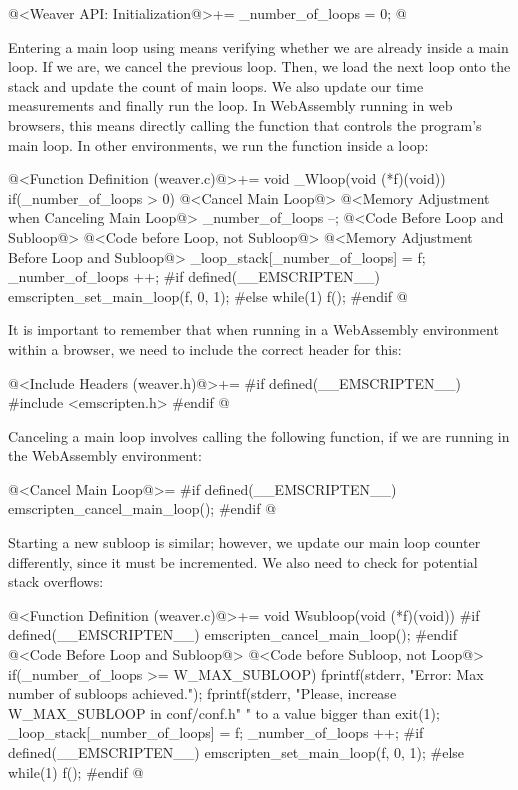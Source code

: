 \iniciocodigo
@<Weaver API: Initialization@>+=
_number_of_loops = 0;
@
\fimcodigo

Entering a main loop using  means verifying whether
we are already inside a main loop. If we are, we cancel the previous
loop. Then, we load the next loop onto the stack and update the count
of main loops. We also update our time measurements and finally run
the loop. In WebAssembly running in web browsers, this means directly
calling the function that controls the program's main loop. In other
environments, we run the function inside a  loop:

\iniciocodigo
@<Function Definition (weaver.c)@>+=
void _Wloop(void (*f)(void)){
  if(_number_of_loops > 0){
    @<Cancel Main Loop@>
    @<Memory Adjustment when Canceling Main Loop@>
    _number_of_loops --;
  }
  @<Code Before Loop and Subloop@>
  @<Code before Loop, not Subloop@>
  @<Memory Adjustment Before Loop and Subloop@>
  _loop_stack[_number_of_loops] = f;
  _number_of_loops ++;
#if defined(__EMSCRIPTEN__)
  emscripten_set_main_loop(f, 0, 1);
#else
  while(1)
    f();
#endif
}
@
\fimcodigo

It is important to remember that when running in a WebAssembly
environment within a browser, we need to include the correct header
for this:

\iniciocodigo
@<Include Headers (weaver.h)@>+=
#if defined(__EMSCRIPTEN__)
#include <emscripten.h>
#endif
@
\fimcodigo

Canceling a main loop involves calling the following function, if we
are running in the WebAssembly environment:

\iniciocodigo
@<Cancel Main Loop@>=
#if defined(__EMSCRIPTEN__)
emscripten_cancel_main_loop();
#endif
@
\fimcodigo

Starting a new subloop is similar; however, we update our main loop
counter differently, since it must be incremented. We also need to
check for potential stack overflows:

\iniciocodigo
@<Function Definition (weaver.c)@>+=
void Wsubloop(void (*f)(void)){
#if defined(__EMSCRIPTEN__)
    emscripten_cancel_main_loop();
#endif
  @<Code Before Loop and Subloop@>
  @<Code before Subloop, not Loop@>
  if(_number_of_loops >= W_MAX_SUBLOOP){
    fprintf(stderr, "Error: Max number of subloops achieved.\n");
    fprintf(stderr, "Please, increase W_MAX_SUBLOOP in conf/conf.h"
            " to a value bigger than %
    exit(1);
  }
  _loop_stack[_number_of_loops] = f;
  _number_of_loops ++;
#if defined(__EMSCRIPTEN__)
  emscripten_set_main_loop(f, 0, 1);
#else
  while(1)
    f();
#endif
}
@
\fimcodigo

